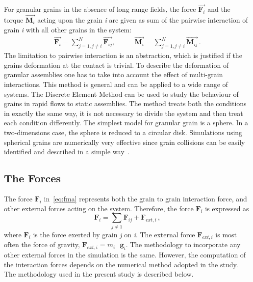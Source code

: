 For granular grains in the absence of long range fields, the force  
$\overrightarrow{\mathbf{F}_{i}}$ and the torque  
$\overrightarrow{\mathbf{M}_{i}}$ acting upon the grain \textit{i} are given as 
sum of the pairwise interaction of grain \textit{i} with 
all other grains in the system:
%
\begin{align}
   \overrightarrow{{\mathbf{F}}_i}=\sum\limits_{j=1,j\ne 
   i}^{N}{\overrightarrow{\mathbf{F}_{ij}}}, \qquad 
   &\overrightarrow{\mathbf{M}_{i}}=\sum\limits_{j=1,j\ne 
   i}^{N}{\overrightarrow{\mathbf{M}_{ij}}} \,.
\end{align}
%
The limitation to pairwise interaction is an abstraction, which is justified 
if the grains deformation at the contact is trivial. To describe the 
deformation of granular assemblies one has to take into account the effect of 
multi-grain interactions. This method is general and can be applied to a wide 
range of systems. The Discrete Element Method can be used to study the 
behaviour of grains in rapid flows to static assemblies. The method treats 
both the conditions in exactly the same way, it is not necessary to divide the 
system and then treat each condition differently. The simplest model for 
granular grain is a sphere. In a two-dimensions case, the sphere is reduced to 
a circular disk. Simulations using spherical grains are numerically very 
effective since grain collisions can be easily identified and described in 
a simple way~\citep{Poschel2005}.

% 

\subsection{The Forces}

The force $\mathbf{F}_{\mathit{i}}$ in~\cref{eq:fma} represents both the grain 
to grain interaction force, and other external forces acting on the system. 
Therefore, the force $\mathbf{F}_{\mathit{i}}$ is expressed as
%
\begin{equation} \label{eq:f}
 \mathbf{{F}}_{i}=\sum\limits_{j\ne 1}{\mathbf{{F}}_{ij}+\mathbf{{F}}_{ext, 
 i}}\,,
\end{equation}
%
where $\mathbf{F}_{\mathit{i}}$ is the force exerted by grain \textit{j} on 
\textit{i}. The external force $\mathbf{F}_{\mathit{ext,i}}$ is most often the 
force of gravity, $\mathbf{F}_{\mathit{ext,i}} = m_{\mathit{i}} \mbox{ 
}\mathbf{g}_{\mathit{i}}$. The methodology to incorporate any other external 
forces in the simulation is the same. However, the computation of the 
interaction forces depends on the numerical method adopted in the study. 
The methodology used in the present study is described below. 

